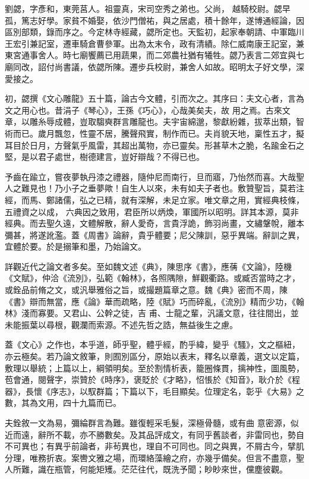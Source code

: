 \begin{pinyinscope}
 劉勰，字彥和，東莞莒人。祖靈真，宋司空秀之弟也。父尚，
 越騎校尉。勰早孤，篤志好學。家貧不婚娶，依沙門僧祐，與之居處，積十餘年，遂博通經論，因區別部類，錄而序之。今定林寺經藏，勰所定也。天監初，起家奉朝請、中軍臨川王宏引兼記室，遷車騎倉曹參軍。出為太末令，政有清績。除仁威南康王記室，兼東宮通事舍人。時七廟饗薦已用蔬果，而二郊農社猶有犧牲。勰乃表言二郊宜與七廟同改，詔付尚書議，依勰所陳。遷步兵校尉，兼舍人如故。昭明太子好文學，深愛接之。



 初，勰撰《文心雕龍》五十篇，論古今文體，引而次之。其序曰：夫文心者，言為文之用心也。昔涓子《琴心》，王孫《巧心》，心哉美矣夫，故
 用之焉。古來文章，以雕糸辱成體，豈取騶奭群言雕龍也。夫宇宙綿邈，黎獻紛雜，拔萃出類，智術而已。歲月飄忽，性靈不居，騰聲飛實，制作而已。夫肖貌天地，稟性五才，擬耳目於日月，方聲氣乎風雷，其超出萬物，亦已靈矣。形甚草木之脆，名踰金石之堅，是以君子處世，樹德建言，豈好辯哉？不得已也。



 予齒在踰立，嘗夜夢執丹漆之禮器，隨仲尼而南行，旦而寤，乃怡然而喜。大哉聖人之難見也！乃小子之垂夢歟！自生人以來，未有如夫子者也。敷贊聖旨，莫若注經，而馬、鄭諸儒，弘之已精，就有深解，未足立家。唯文章之用，實經典枝條，五禮資之以成，
 六典因之致用，君臣所以炳煥，軍國所以昭明。詳其本源，莫非經典。而去聖久遠，文體解散，辭人愛奇，言貴浮詭，飾羽尚畫，文繡鞶帨，離本彌甚，將遂訛濫。蓋《周書》論辭，貴乎體要；尼父陳訓，惡乎異端。辭訓之異，宜體於要。於是搦筆和墨，乃始論文。



 詳觀近代之論文者多矣。至如魏文述《典》，陳思序《書》，應蒨《文論》，陸機《文賦》，仲洽《流別》，弘範《翰林》，各照隅隙，鮮觀衢路。或臧否當時之才，或銓品前脩之文，或汎舉雅俗之旨，或撮題篇章之意。魏《典》密而不周，陳《書》辯而無當，應《論》華而疏略，陸《賦》巧而碎亂，《流別》精而少功，《翰林》淺而寡要。又君山、公幹之徒，吉
 甫、士龍之輩，汎議文意，往往間出，並未能振葉以尋根，觀瀾而索源。不述先哲之誥，無益後生之慮。



 蓋《文心》之作也，本乎道，師乎聖，體乎經，酌乎緯，變乎《騷》，文之樞紐，亦云極矣。若乃論文敘筆，則囿別區分，原始以表末，釋名以章義，選文以定篇，敷理以舉統；上篇以上，綱領明矣。至於割情析表，籠圈條貫，摛神性，圖風勢，苞會通，閱聲字，崇贊於《時序》，褒貶於《才略》，怊悵於《知音》，耿介於《程器》，長懷《序志》，以馭群篇；下篇以下，毛目顯矣。位理定名，彰乎《大易》之數，其為文用，四十九篇而已。



 夫銓敘一文為易，彌綸群言為難。雖復輕采毛髮，深極骨髓，或有曲
 意密源，似近而遠，辭所不載，亦不勝數矣。及其品評成文，有同乎舊談者，非雷同也，勢自不可異也；有異乎前論者，非茍異也，理自不可同也。同之與異，不屑古今，擘肌分理，唯務折衷。案轡文雅之場，而環絡藻繪之府，亦幾乎備矣。但言不盡意，聖人所難，識在瓶管，何能矩矱。茫茫往代，既洗予聞；眇眇來世，儻塵彼觀。




\end{pinyinscope}
